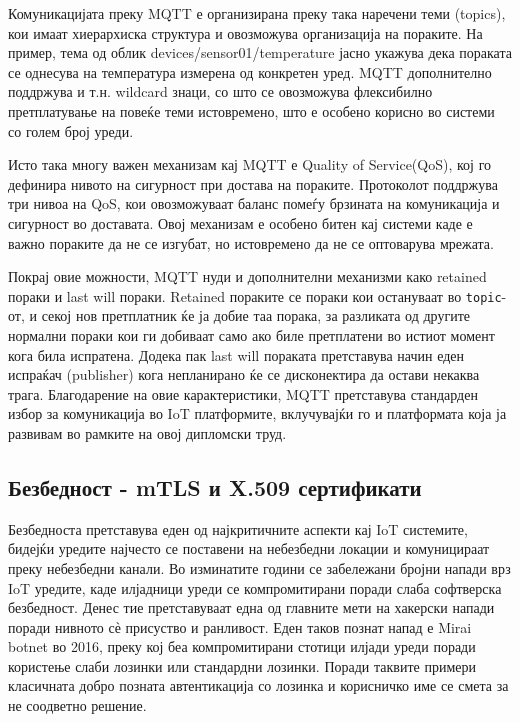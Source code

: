 Комуникацијата преку MQTT е организирана преку така наречени теми
(topics), кои имаат хиерархиска структура и овозможува организација на
пораките. На пример, тема од облик devices/sensor01/temperature јасно
укажува дека пораката се однесува на температура измерена од конкретен
уред. MQTT дополнително поддржува и т.н. wildcard знаци, со што се
овозможува флексибилно претплатување на повеќе теми истовремено, што е
особено корисно во системи со голем број уреди.

Исто така многу важен механизам кај MQTT е Quality of Service(QoS), кој
го дефинира нивото на сигурност при достава на пораките. Протоколот
поддржува три нивоа на QoS, кои овозможуваат баланс помеѓу брзината на
комуникација и сигурност во доставата. Овој механизам е особено битен
кај системи каде е важно пораките да не се изгубат, но истовремено да не
се оптоварува мрежата.

Покрај овие можности, MQTT нуди и дополнителни механизми како retained
пораки и last will пораки. Retained пораките се пораки кои остануваат во
\texttt{topic}-от, и секој нов претплатник ќе ја добие таа порака, за разликата
од другите нормални пораки кои ги добиваат само ако биле претплатени во
истиот момент кога била испратена. Додека пак last will пораката
претставува начин еден испраќач (publisher) кога непланирано ќе се
дисконектира да остави некаква трага. Благодарение на овие
карактеристики, MQTT претставува стандарден избор за комуникација во IoT
платформите, вклучувајќи го и платформата која ја развивам во рамките на
овој дипломски труд.

\subsection{Безбедност - mTLS и X.509 сертификати}

Безбедноста претставува еден од најкритичните аспекти кај IoT системите,
бидејќи уредите најчесто се поставени на небезбедни локации и
комуницираат преку небезбедни канали. Во изминатите години се забележани
бројни напади врз IoT уредите, каде илјадници уреди се компромитирани
поради слаба софтверска безбедност. Денес тие претставуваат една од
главните мети на хакерски напади поради нивното сѐ присуство и
ранливост. Еден таков познат напад е Mirai botnet во 2016, преку кој беа
компромитирани стотици илјади уреди поради користење слаби лозинки или
стандардни лозинки. Поради таквите примери класичната добро позната
автентикација со лозинка и корисничко име се смета за не соодветно
решение.

